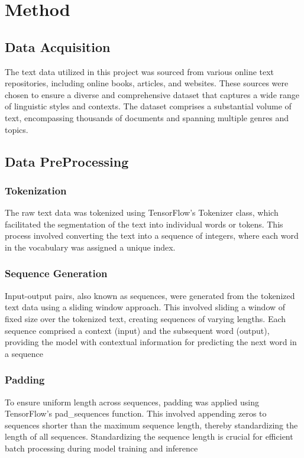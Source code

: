 \documentclass[conference]{IEEEtran}
\begin{document}
\section{Method}

\subsection{Data Acquisition }

The text data utilized in this project was sourced from various online text repositories, including online books, articles, and websites. These sources were chosen to ensure a diverse and comprehensive dataset that captures a wide range of linguistic styles and contexts. The dataset comprises a substantial volume of text, encompassing thousands of documents and spanning multiple genres and topics. 

\subsection{Data PreProcessing}
\subsubsection{Tokenization}
The raw text data was tokenized using TensorFlow's Tokenizer class, which facilitated the segmentation of the text into individual words or tokens. This process involved converting the text into a sequence of integers, where each word in the vocabulary was assigned a unique index. 
\subsubsection{Sequence Generation }
Input-output pairs, also known as sequences, were generated from the tokenized text data using a sliding window approach. This involved sliding a window of fixed size over the tokenized text, creating sequences of varying lengths. Each sequence comprised a context (input) and the subsequent word (output), providing the model with contextual information for predicting the next word in a sequence 
\subsubsection{Padding}
To ensure uniform length across sequences, padding was applied using TensorFlow's pad\_sequences function. This involved appending zeros to sequences shorter than the maximum sequence length, thereby standardizing the length of all sequences. Standardizing the sequence length is crucial for efficient batch processing during model training and inference 
\end{document}
